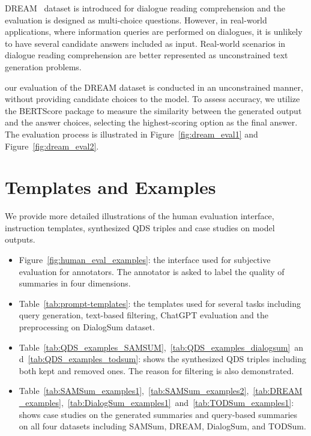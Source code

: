 \documentclass[11pt]{article}
\begin{document}
        DREAM~\cite{sun-etal-2019-dream} dataset is introduced for dialogue reading comprehension and the evaluation is designed as multi-choice questions. However, in real-world applications, where information queries are performed on dialogues, it is unlikely to have several candidate answers included as input. Real-world scenarios in dialogue reading comprehension are better represented as unconstrained text generation problems.

        our evaluation of the DREAM dataset is conducted in an unconstrained manner, without providing candidate choices to the model. To assess accuracy, we utilize the BERTScore package to measure the similarity between the generated output and the answer choices, selecting the highest-scoring option as the final answer. The evaluation process is illustrated in Figure~\ref{fig:dream_eval1} and Figure~\ref{fig:dream_eval2}.



\section{Templates and Examples}

    We provide more detailed illustrations of the human evaluation interface, instruction templates, synthesized QDS triples and case studies on model outputs.

    \begin{itemize}
        \item Figure~\ref{fig:human_eval_examples}: the interface used for subjective evaluation for annotators. The annotator is asked to label the quality of summaries in four dimensions.
        
        \item Table~\ref{tab:prompt-templates}: the templates used for several tasks including query generation, text-based filtering, ChatGPT evaluation and the preprocessing on DialogSum dataset.
        \item Table~\ref{tab:QDS_examples_SAMSUM},~\ref{tab:QDS_examples_dialogsum}~and~\ref{tab:QDS_examples_todsum}: shows the synthesized QDS triples including both kept and removed ones. The reason for filtering is also demonstrated.
        \item Table~\ref{tab:SAMSum_examples1},~\ref{tab:SAMSum_examples2},~\ref{tab:DREAM_examples},~\ref{tab:DialogSum_examples1}~and~\ref{tab:TODSum_examples1}: shows case studies on the generated summaries and query-based summaries on all four datasets including SAMSum, DREAM, DialogSum, and TODSum.
    \end{itemize}
\end{document}
